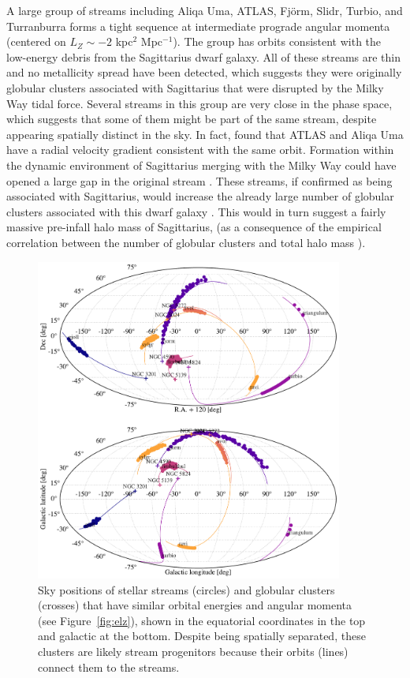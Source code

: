 \documentclass[twocolumn]{aastex63}
\begin{document}
A large group of streams including Aliqa Uma, ATLAS, Fj\" orm, Slidr, Turbio, and Turranburra forms a tight sequence at intermediate prograde angular momenta (centered on $L_Z\sim-2$ kpc$^2$ Mpc$^{-1}$).
The group has orbits consistent with the low-energy debris from the Sagittarius dwarf galaxy.
All of these streams are thin and no metallicity spread have been detected, which suggests they were originally globular clusters associated with Sagittarius that were disrupted by the Milky Way tidal force.
Several streams in this group are very close in the phase space, which suggests that some of them might be part of the same stream, despite appearing spatially distinct in the sky.
In fact, \citet{li2020} found that ATLAS and Aliqa Uma have a radial velocity gradient consistent with the same orbit.
Formation within the dynamic environment of Sagittarius merging with the Milky Way could have opened a large gap in the original stream \citep{bonaca2020b, deboer2020}.
These streams, if confirmed as being associated with Sagittarius, would increase the already large number of globular clusters associated with this dwarf galaxy \citep[$5-7$; see][]{Johnson2020}.  
This would in turn suggest a fairly massive pre-infall halo mass of Sagittarius,  (as a consequence of the empirical correlation between the number of globular clusters and total halo mass \cite{Harris, Burkert, etc.}).

\begin{figure}
\begin{center}
\includegraphics[width=0.9\textwidth]{sky_orbits.pdf}
\end{center}
\caption{
Sky positions of stellar streams (circles) and globular clusters (crosses) that have similar orbital energies and angular momenta (see Figure~\ref{fig:elz}), shown in the equatorial coordinates in the top and galactic at the bottom.
Despite being spatially separated, these clusters are likely stream progenitors because their orbits (lines) connect them to the streams.
}
\label{fig:sky}
\end{figure}
\end{document}
